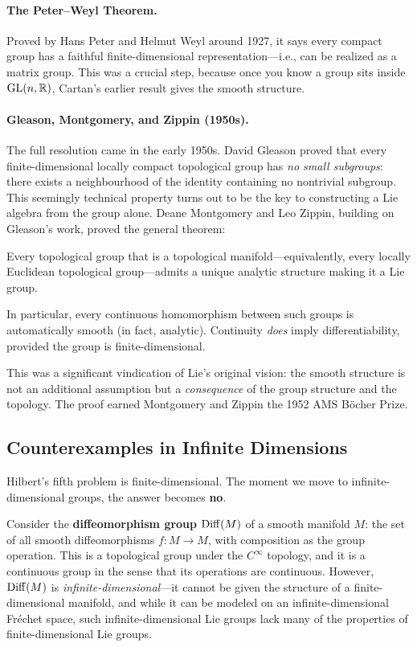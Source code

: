 \paragraph{The Peter--Weyl Theorem.} Proved by Hans Peter and Helmut Weyl around 1927, it says every compact group has a faithful finite-dimensional representation---i.e., can be realized as a matrix group. This was a crucial step, because once you know a group sits inside $\operatorname{GL}(n,\mathbb{R})$, Cartan's earlier result gives the smooth structure.

\paragraph{Gleason, Montgomery, and Zippin (1950s).} The full resolution came in the early 1950s. David Gleason proved that every finite-dimensional locally compact topological group has \emph{no small subgroups}: there exists a neighbourhood of the identity containing no nontrivial subgroup. This seemingly technical property turns out to be the key to constructing a Lie algebra from the group alone. Deane Montgomery and Leo Zippin, building on Gleason's work, proved the general theorem:

\begin{theorem}\label{thm:hilbert-5}
Every topological group that is a topological manifold---equivalently, every locally Euclidean topological group---admits a unique analytic structure making it a Lie group.
\end{theorem}

In particular, every continuous homomorphism between such groups is automatically smooth (in fact, analytic). Continuity \emph{does} imply differentiability, provided the group is finite-dimensional.

This was a significant vindication of Lie's original vision: the smooth structure is not an additional assumption but a \emph{consequence} of the group structure and the topology. The proof earned Montgomery and Zippin the 1952 AMS Böcher Prize.

\subsection{Counterexamples in Infinite Dimensions}

Hilbert's fifth problem is finite-dimensional. The moment we move to infinite-dimensional groups, the answer becomes \textbf{no}.

Consider the \textbf{diffeomorphism group} $\operatorname{Diff}(M)$ of a smooth manifold $M$: the set of all smooth diffeomorphisms $f \colon M \to M$, with composition as the group operation. This is a topological group under the $C^\infty$ topology, and it is a continuous group in the sense that its operations are continuous. However, $\operatorname{Diff}(M)$ is \emph{infinite-dimensional}---it cannot be given the structure of a finite-dimensional manifold, and while it can be modeled on an infinite-dimensional Fréchet space, such infinite-dimensional Lie groups lack many of the properties of finite-dimensional Lie groups.

